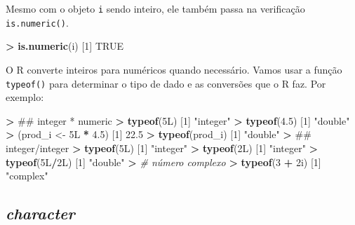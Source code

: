 \documentclass[]{book}
\newenvironment{Shaded}{\begin{snugshade}}{\end{snugshade}}
\newcommand{\KeywordTok}[1]{\textcolor[rgb]{0.13,0.29,0.53}{\textbf{#1}}}
\newcommand{\DecValTok}[1]{\textcolor[rgb]{0.00,0.00,0.81}{#1}}
\newcommand{\FloatTok}[1]{\textcolor[rgb]{0.00,0.00,0.81}{#1}}
\newcommand{\StringTok}[1]{\textcolor[rgb]{0.31,0.60,0.02}{#1}}
\newcommand{\CommentTok}[1]{\textcolor[rgb]{0.56,0.35,0.01}{\textit{#1}}}
\newcommand{\OtherTok}[1]{\textcolor[rgb]{0.56,0.35,0.01}{#1}}
\newcommand{\OperatorTok}[1]{\textcolor[rgb]{0.81,0.36,0.00}{\textbf{#1}}}
\newcommand{\ErrorTok}[1]{\textcolor[rgb]{0.64,0.00,0.00}{\textbf{#1}}}
\newcommand{\NormalTok}[1]{#1}
\begin{document}
Mesmo com o objeto \texttt{i} sendo inteiro, ele também passa na
verificação \texttt{is.numeric()}.

\begin{Shaded}
\begin{Highlighting}[]
\OperatorTok{>}\StringTok{ }\KeywordTok{is.numeric}\NormalTok{(i)}
\NormalTok{[}\DecValTok{1}\NormalTok{] }\OtherTok{TRUE}
\end{Highlighting}
\end{Shaded}

O R converte inteiros para numéricos quando necessário. Vamos usar a
função \texttt{typeof()} para determinar o tipo de dado e as conversões
que o R faz. Por exemplo:

\begin{Shaded}
\begin{Highlighting}[]
\OperatorTok{>}\StringTok{ }\NormalTok{## integer * numeric}
\ErrorTok{>}\StringTok{ }\KeywordTok{typeof}\NormalTok{(5L)}
\NormalTok{[}\DecValTok{1}\NormalTok{] }\StringTok{"integer"}
\OperatorTok{>}\StringTok{ }\KeywordTok{typeof}\NormalTok{(}\FloatTok{4.5}\NormalTok{)}
\NormalTok{[}\DecValTok{1}\NormalTok{] }\StringTok{"double"}
\OperatorTok{>}\StringTok{ }\NormalTok{(prod_i <-}\StringTok{ }\NormalTok{5L }\OperatorTok{*}\StringTok{ }\FloatTok{4.5}\NormalTok{)}
\NormalTok{[}\DecValTok{1}\NormalTok{] }\FloatTok{22.5}
\OperatorTok{>}\StringTok{ }\KeywordTok{typeof}\NormalTok{(prod_i)}
\NormalTok{[}\DecValTok{1}\NormalTok{] }\StringTok{"double"}
\OperatorTok{>}\StringTok{ }\NormalTok{## integer/integer}
\ErrorTok{>}\StringTok{ }\KeywordTok{typeof}\NormalTok{(5L)}
\NormalTok{[}\DecValTok{1}\NormalTok{] }\StringTok{"integer"}
\OperatorTok{>}\StringTok{ }\KeywordTok{typeof}\NormalTok{(2L)}
\NormalTok{[}\DecValTok{1}\NormalTok{] }\StringTok{"integer"}
\OperatorTok{>}\StringTok{ }\KeywordTok{typeof}\NormalTok{(5L}\OperatorTok{/}\NormalTok{2L)}
\NormalTok{[}\DecValTok{1}\NormalTok{] }\StringTok{"double"}
\OperatorTok{>}\StringTok{ }\CommentTok{# número complexo}
\ErrorTok{>}\StringTok{ }\KeywordTok{typeof}\NormalTok{(}\DecValTok{3} \OperatorTok{+}\StringTok{ }\NormalTok{2i)}
\NormalTok{[}\DecValTok{1}\NormalTok{] }\StringTok{"complex"}
\end{Highlighting}
\end{Shaded}

\subsection{\texorpdfstring{\emph{character}}{character}}\label{character}
\end{document}
